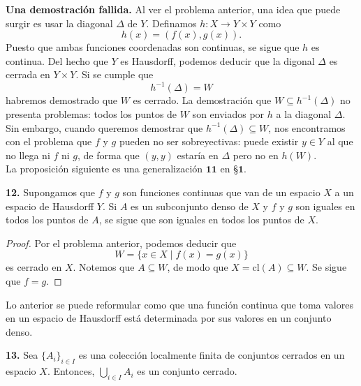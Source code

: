 \documentclass{article}
\begin{document}
\textbf{Una demostración fallida. } Al ver el problema anterior, una idea que puede surgir es usar la diagonal $\Delta$ de $Y$. Definamos $h: X \rightarrow Y \times Y$ como 
$$ h(x) = ( f(x), g(x) ). $$
Puesto que ambas funciones coordenadas son continuas, se sigue que $h$ es continua. Del hecho que $Y$ es Hausdorff, podemos deducir que la digonal $\Delta$ es cerrada en $Y \times Y$. Si se cumple que
$$ h^{-1}(\Delta) = W $$
habremos demostrado que $W$ es cerrado. La demostración que $W \subseteq h^{-1}(\Delta)$ no presenta problemas: todos los puntos de $W$ son enviados por $h$ a la diagonal $\Delta$. 
Sin embargo, cuando queremos demostrar que $h^{-1}(\Delta) \subseteq W$, nos encontramos con el problema que $f$ y $g$ pueden no ser sobreyectivas: puede existir $y \in Y$ al que no llega ni $f$ ni $g$, de forma que $(y, y)$ estaría en $\Delta$ pero no en $h(W)$.\\

La proposición siguiente es una generalización $\mathbf{11}$ en §$\mathbf{1}$.

\begin{mybox}
	\textbf{12. } Supongamos que $f$ y $g$ son funciones continuas que van de un espacio $X$ a un espacio de Hausdorff $Y$. Si $A$ es un subconjunto denso de $X$ y $f$ y $g$ son iguales en todos los puntos de $A$, se sigue que son iguales en todos los puntos de $X$. 
\end{mybox}	
\begin{proof}
	Por el problema anterior, podemos deducir que 
	$$ W = \{ x \in X \mid f(x) = g(x) \}$$
	es cerrado en $X$. Notemos que $A \subseteq W$, de modo que $X = \text{cl}(A) \subseteq W$. Se sigue que $f = g$. 
\end{proof}

Lo anterior se puede reformular como que una función continua que toma valores en un espacio de Hausdorff está determinada por sus valores en un conjunto denso. \\

\begin{mybox}
	\textbf{13. } Sea $\{A_{i} \}_{i \in I}$ es una colección localmente finita de conjuntos cerrados en un espacio $X$. Entonces, $\bigcup_{i \in I} A_{i}$ es un conjunto cerrado. 
\end{mybox}	
\end{document}

